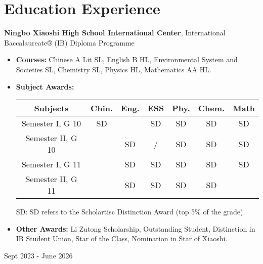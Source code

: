 \documentclass[10pt, letterpaper]{article}
\newenvironment{highlights}{
    \begin{itemize}[
        topsep=0.10 cm,
        parsep=0.10 cm,
        partopsep=0pt,
        itemsep=0pt,
        leftmargin=0.4 cm + 10pt
    ]
}{
    \end{itemize}
} %
\newenvironment{twocolentry}[2][]{
    \onecolentry
    \def\secondColumn{#2}
    \setcolumnwidth{\fill, 4.5 cm}
    \begin{paracol}{2}
}{
    \switchcolumn \raggedleft \secondColumn
    \end{paracol}
    \endonecolentry
} %
\let\hrefWithoutArrow\href
\renewcommand{\href}[2]{\hrefWithoutArrow{#1}{\ifthenelse{\equal{#2}{}}{ }{#2 }\raisebox{.15ex}{\footnotesize \faExternalLink*}}}
\begin{document}
    \section{Education Experience}
        \begin{twocolentry}{ Sept 2023 - June 2026 }
            \textbf{Ningbo Xiaoshi High School International Center}, International Baccalaureate® (IB) Diploma Programme
            \begin{highlights}
                \item \textbf{Courses:} Chinese A Lit SL, English B HL, Environmental System and Societies SL, Chemistry SL, Physics HL, Mathematics AA HL.
                \item \textbf{Subject Awards:}
                
                \vspace{0.2cm}
                \begin{tabular}{ c c c c c c c }
                    \hline
                    Subjects & Chin. & Eng. & ESS & Phy. & Chem. & Math \\ \hline
                    Semester I, G 10 & SD &  & SD & SD & SD & SD \\ %
                    Semester II, G 10 &  & SD & / & SD & SD & SD \\ 
                    Semester I, G 11 &  & SD & SD & SD & SD & SD \\
                    Semester II, G 11 &  & SD & SD & SD & SD &  \\ \hline
                \end{tabular}
                \vspace{0.1cm} 
                
                {
                    \small

                SD: SD refers to the Scholartisc Distinction Award (top 5\% of the grade). %
                
                }
                
                \item \textbf{Other Awards:}
                Li Zutong Scholarship, Outstanding Student, Distinction in IB Student Union, Star of the Class, Nomination in Star of Xiaoshi.
                
                
            \end{highlights}
        \end{twocolentry}
\end{document}
